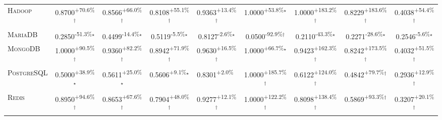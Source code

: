 \begin{table}[htbp]
\begin{tabular}{l|cccc|cccc}
\textsc{Hadoop} & \cellcolor{green!30}0.8700\textsuperscript{+70.6\%}$^\dagger$ & \cellcolor{green!30}0.8566\textsuperscript{+66.0\%}$^\dagger$ & \cellcolor{green!30}0.8108\textsuperscript{+55.1\%}$^\dagger$ & \cellcolor{green!30}0.9363\textsuperscript{+13.4\%}$^\dagger$ & \cellcolor{green!30}1.0000\textsuperscript{+53.8\%}$^\star$ & \cellcolor{green!30}1.0000\textsuperscript{+183.2\%}$^\dagger$ & \cellcolor{green!30}0.8229\textsuperscript{+183.6\%}$^\dagger$ & \cellcolor{green!30}0.4038\textsuperscript{+54.4\%}$^\dagger$ \\
\textsc{MariaDB} & \cellcolor{red!30}0.2850\textsuperscript{-51.3\%}$^\star$ & \cellcolor{red!30}0.4499\textsuperscript{-14.4\%}$^\star$ & \cellcolor{red!30}0.5119\textsuperscript{-5.5\%}$^\star$ & \cellcolor{red!30}0.8127\textsuperscript{-2.6\%}$^\star$ & \cellcolor{red!30}0.0500\textsuperscript{-92.9\%}$^\dagger$ & \cellcolor{red!30}0.2110\textsuperscript{-43.3\%}$^\star$ & \cellcolor{red!30}0.2271\textsuperscript{-28.6\%}$^\star$ & \cellcolor{red!30}0.2546\textsuperscript{-5.6\%}$^\star$ \\
\textsc{MongoDB} & \cellcolor{green!30}1.0000\textsuperscript{+90.5\%}$^\dagger$ & \cellcolor{green!30}0.9360\textsuperscript{+82.2\%}$^\dagger$ & \cellcolor{green!30}0.8942\textsuperscript{+71.9\%}$^\dagger$ & \cellcolor{green!30}0.9630\textsuperscript{+16.5\%}$^\dagger$ & \cellcolor{green!30}1.0000\textsuperscript{+66.7\%}$^\star$ & \cellcolor{green!30}0.9423\textsuperscript{+162.3\%}$^\dagger$ & \cellcolor{green!30}0.8242\textsuperscript{+173.5\%}$^\dagger$ & \cellcolor{green!30}0.4032\textsuperscript{+51.5\%}$^\dagger$ \\
\textsc{PostgreSQL} & \cellcolor{green!30}0.5000\textsuperscript{+38.9\%}$^\star$ & \cellcolor{green!30}0.5611\textsuperscript{+25.0\%}$^\star$ & \cellcolor{green!30}0.5606\textsuperscript{+9.1\%}$^\star$ & \cellcolor{green!30}0.8301\textsuperscript{+2.0\%}$^{\,\,\,}$ & \cellcolor{green!30}1.0000\textsuperscript{+185.7\%}$^\dagger$ & \cellcolor{green!30}0.6122\textsuperscript{+124.0\%}$^\dagger$ & \cellcolor{green!30}0.4842\textsuperscript{+79.7\%}$^\dagger$ & \cellcolor{green!30}0.2936\textsuperscript{+12.9\%}$^\dagger$ \\
\textsc{Redis} & \cellcolor{green!30}0.8950\textsuperscript{+94.6\%}$^\dagger$ & \cellcolor{green!30}0.8653\textsuperscript{+67.6\%}$^\dagger$ & \cellcolor{green!30}0.7904\textsuperscript{+48.0\%}$^\dagger$ & \cellcolor{green!30}0.9277\textsuperscript{+12.1\%}$^\dagger$ & \cellcolor{green!30}1.0000\textsuperscript{+122.2\%}$^\dagger$ & \cellcolor{green!30}0.8098\textsuperscript{+138.4\%}$^\dagger$ & \cellcolor{green!30}0.5869\textsuperscript{+93.3\%}$^\dagger$ & \cellcolor{green!30}0.3207\textsuperscript{+20.1\%}$^\dagger$ \\

\end{tabular}
\end{table}
